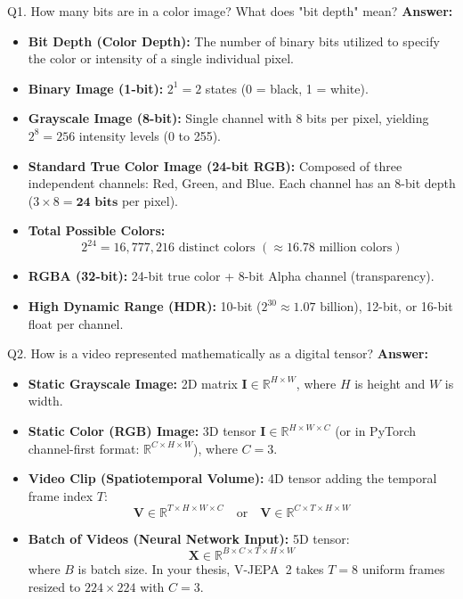 \documentclass[a4paper, 11pt]{article}
\begin{document}
\begin{questionbox}{Q1. How many bits are in a color image? What does "bit depth" mean?}
\textbf{Answer:}
\begin{itemize}
    \item \textbf{Bit Depth (Color Depth):} The number of binary bits utilized to specify the color or intensity of a single individual pixel.
    \item \textbf{Binary Image (1-bit):} $2^1 = 2$ states (0 = black, 1 = white).
    \item \textbf{Grayscale Image (8-bit):} Single channel with 8 bits per pixel, yielding $2^8 = 256$ intensity levels (0 to 255).
    \item \textbf{Standard True Color Image (24-bit RGB):} Composed of three independent channels: Red, Green, and Blue. Each channel has an 8-bit depth ($3 \times 8 = \mathbf{24\text{ bits}}$ per pixel).
    \item \textbf{Total Possible Colors:}
    \[
    2^{24} = 16,777,216 \text{ distinct colors } (\approx 16.78 \text{ million colors})
    \]
    \item \textbf{RGBA (32-bit):} 24-bit true color + 8-bit Alpha channel (transparency).
    \item \textbf{High Dynamic Range (HDR):} 10-bit ($2^{30} \approx 1.07\text{ billion}$), 12-bit, or 16-bit float per channel.
\end{itemize}
\end{questionbox}

\begin{questionbox}{Q2. How is a video represented mathematically as a digital tensor?}
\textbf{Answer:}
\begin{itemize}
    \item \textbf{Static Grayscale Image:} 2D matrix $\mathbf{I} \in \mathbb{R}^{H \times W}$, where $H$ is height and $W$ is width.
    \item \textbf{Static Color (RGB) Image:} 3D tensor $\mathbf{I} \in \mathbb{R}^{H \times W \times C}$ (or in PyTorch channel-first format: $\mathbb{R}^{C \times H \times W}$), where $C=3$.
    \item \textbf{Video Clip (Spatiotemporal Volume):} 4D tensor adding the temporal frame index $T$:
    \[
    \mathbf{V} \in \mathbb{R}^{T \times H \times W \times C} \quad \text{or} \quad \mathbf{V} \in \mathbb{R}^{C \times T \times H \times W}
    \]
    \item \textbf{Batch of Videos (Neural Network Input):} 5D tensor:
    \[
    \mathbf{X} \in \mathbb{R}^{B \times C \times T \times H \times W}
    \]
    where $B$ is batch size. In your thesis, V-JEPA~2 takes $T=8$ uniform frames resized to $224 \times 224$ with $C=3$.
\end{itemize}
\end{questionbox}
\end{document}
